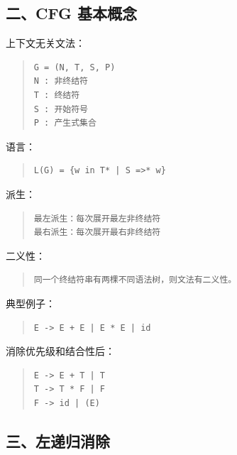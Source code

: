 \documentclass[UTF8,zihao=-4]{ctexart}
\begin{document}
\subsection{二、CFG 基本概念}


上下文无关文法：


\begin{quote}
\footnotesize
\begin{verbatim}
G = (N, T, S, P)
N : 非终结符
T : 终结符
S : 开始符号
P : 产生式集合
\end{verbatim}
\end{quote}


语言：


\begin{quote}
\footnotesize
\begin{verbatim}
L(G) = {w in T* | S =>* w}
\end{verbatim}
\end{quote}


派生：


\begin{quote}
\footnotesize
\begin{verbatim}
最左派生：每次展开最左非终结符
最右派生：每次展开最右非终结符
\end{verbatim}
\end{quote}


二义性：


\begin{quote}
\footnotesize
\begin{verbatim}
同一个终结符串有两棵不同语法树，则文法有二义性。
\end{verbatim}
\end{quote}


典型例子：


\begin{quote}
\footnotesize
\begin{verbatim}
E -> E + E | E * E | id
\end{verbatim}
\end{quote}


消除优先级和结合性后：


\begin{quote}
\footnotesize
\begin{verbatim}
E -> E + T | T
T -> T * F | F
F -> id | (E)
\end{verbatim}
\end{quote}


\subsection{三、左递归消除}
\end{document}
